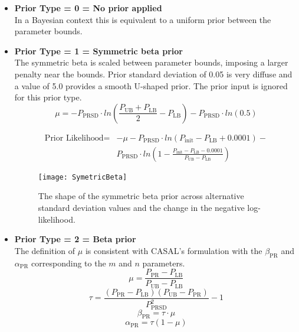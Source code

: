 \begin{itemize}
	\item  \textbf{Prior Type = 0 = No prior applied} \\ 
	In a Bayesian context this is equivalent to a uniform prior between the parameter bounds.
	
	\item  \textbf{Prior Type = 1 = Symmetric beta prior} \\ 
	The symmetric beta is scaled between parameter bounds, imposing a larger penalty near the bounds.  Prior standard deviation of 0.05 is very diffuse and a value of 5.0 provides a smooth U-shaped prior. The prior input is ignored for this prior type.
	\begin{equation} 
		\mu = -P_\text{PRSD} \cdot ln\left(\frac{P_\text{UB}+P_\text{LB}}{2} - P_\text{LB} \right) - P_\text{PRSD} \cdot ln(0.5)
	\end{equation}
	
	\begin{equation}
		\begin{split}
\text{Prior Likelihood} = &-\mu -P_\text{PRSD} \cdot ln\left(P_\text{init}-P_\text{LB}+0.0001\right) - \\
& P_\text{PRSD} \cdot ln\left(1-\frac{P_\text{init}-P_\text{LB}-0.0001}{P_\text{UB}-P_\text{LB}}\right)
		\end{split}
	\end{equation}

	\begin{figure}[ht]
	\begin{center}
		\texttt{[image: SymetricBeta]}\\
	\end{center}
	\caption{The shape of the symmetric beta prior across alternative standard deviation values and the change in the negative log-likelihood.}
	\end{figure}	

	
	\item \textbf{Prior Type = 2 = Beta prior}  \\ 
	The definition of $\mu$ is consistent with CASAL's formulation with the $\beta_\text{PR}$ and $\alpha_\text{PR}$ corresponding to the $m$ and $n$ parameters.
	\begin{equation}
		\mu = \frac{P_\text{PR}-P_\text{LB}}{P_\text{UB}-P_\text{LB}} 
	\end{equation}
	\begin{equation}
		\tau  = \frac{(P_\text{PR}-P_\text{LB})(P_\text{UB}-P_\text{PR})}{P_\text{PRSD}^2}-1
	\end{equation}
	\begin{equation}
		\beta_\text{PR}  = \tau \cdot \mu
	\end{equation}
	\begin{equation}
		\alpha_\text{PR} = \tau (1-\mu)
	\end{equation}
	

\end{itemize}
